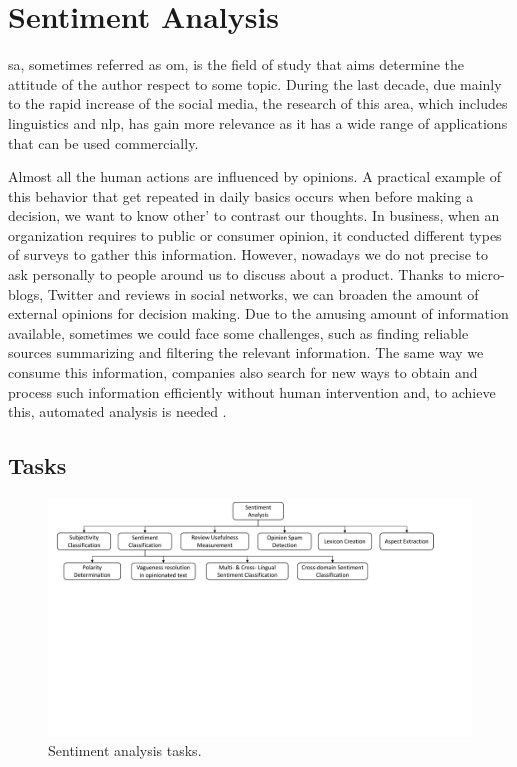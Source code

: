 
\section{Sentiment Analysis}
\label{sec:sentiment_analysis}

\acrfull{sa}, sometimes referred as \acrfull{om}, is the field of study that aims determine the attitude of the author respect to some topic. During the last decade, due mainly to the rapid increase of the social media, the research of this area, which includes linguistics and \acrfull{nlp}, has gain more relevance as it has a wide range of applications that can be used commercially.

Almost all the human actions are influenced by opinions. A practical example of this behavior that get repeated in daily basics occurs when before making a decision, we want to know other' to contrast our thoughts. In business, when an organization requires to public or consumer opinion, it conducted different types of surveys to gather this information. However, nowadays we do not precise to ask personally to people around us to discuss about a product. Thanks to micro-blogs, Twitter and reviews in social networks, we can broaden the amount of external opinions for decision making. Due to the amusing amount of information available, sometimes we could face some challenges, such as finding reliable sources summarizing and filtering the relevant information. The same way we consume this information, companies also search for new ways to obtain and process such information efficiently without human intervention and, to achieve this, automated analysis is needed \cite{liu2012sentiment}.

\subsection{Tasks}
\label{subsec:sentiment_analysis_tasks}

\begin{figure}[!htp]
  \center
  \includegraphics[width=1\textwidth]{figures/sentiment_analysis_tasks}
  \caption{Sentiment analysis tasks.}
  \label{fig:sentiment_analysis_tasks}
\end{figure}

